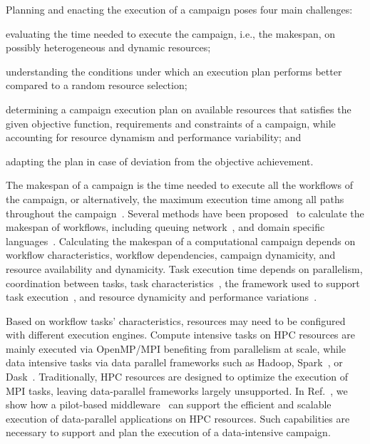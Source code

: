 Planning and enacting the execution of a campaign poses four main challenges: 
\begin{inparaenum}[(i)]
\item evaluating the time needed to execute the campaign, i.e., the makespan, on possibly heterogeneous and dynamic resources;
\item  understanding the conditions under which an execution plan performs better compared to a random resource selection;
\item determining a campaign execution plan on available resources that satisfies the given objective function, requirements and constraints of a campaign, while accounting for resource dynamism and performance variability; and
\item adapting the plan in case of deviation from the objective achievement.
\end{inparaenum}

The makespan of a campaign is the time needed to execute all the workflows of the campaign, or alternatively, the maximum execution time among all paths throughout the campaign~\cite{chirkin2017execution}. Several methods have been proposed~\cite{lu2019review} to calculate the makespan of workflows, including queuing network~\cite{yao2019throughput,bao2019performance}, and domain specific languages~\cite{carothers2017durango,maheshwari2016workflow}. Calculating the makespan of a computational campaign depends on workflow characteristics, workflow dependencies, campaign dynamicity, and resource availability and dynamicity. Task execution time depends on parallelism, coordination between tasks, task characteristics~\cite{khoshlessan2017parallel}, the framework used to support task execution~\cite{paraskevakos2018task}, and resource dynamicity and performance variations~\cite{paraskevakos2019workflow, pouchard2019computational}.

Based on workflow tasks’ characteristics, resources may need to be configured with different execution engines. Compute intensive tasks on HPC resources are mainly executed via OpenMP/MPI benefiting from parallelism at scale, while data intensive tasks via data parallel frameworks such as Hadoop, Spark~\cite{zaharia2010spark}, or Dask~\cite{rocklin2015dask}. Traditionally, HPC resources are designed to optimize the execution of MPI tasks, leaving data-parallel frameworks largely unsupported. In Ref.~\cite{luckow2016hadoop}, we show how a pilot-based middleware~\cite{merzky2019using} can support the efficient and scalable execution of data-parallel applications on HPC resources. Such capabilities are necessary to support and plan the execution of a data-intensive campaign.

